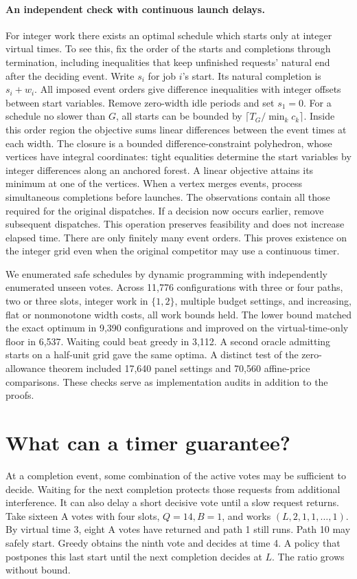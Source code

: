 \paragraph{An independent check with continuous launch delays.}
For integer work there exists an optimal schedule which starts only at integer virtual times. To see this, fix the order of the starts and completions through termination, including inequalities that keep unfinished requests' natural end after the deciding event. Write \(s_i\) for job \(i\)'s start. Its natural completion is \(s_i+w_i\). All imposed event orders give difference inequalities with integer offsets between start variables. Remove zero-width idle periods and set \(s_1=0\). For a schedule no slower than \(G\), all starts can be bounded by \(\lceil T_G/\min_k c_k\rceil\). Inside this order region the objective sums linear differences between the event times at each width. The closure is a bounded difference-constraint polyhedron, whose vertices have integral coordinates: tight equalities determine the start variables by integer differences along an anchored forest. A linear objective attains its minimum at one of the vertices. When a vertex merges events, process simultaneous completions before launches. The observations contain all those required for the original dispatches. If a decision now occurs earlier, remove subsequent dispatches. This operation preserves feasibility and does not increase elapsed time. There are only finitely many event orders. This proves existence on the integer grid even when the original competitor may use a continuous timer.

We enumerated safe schedules by dynamic programming with independently enumerated unseen votes. Across 11,776 configurations with three or four paths, two or three slots, integer work in \(\{1,2\}\), multiple budget settings, and increasing, flat or nonmonotone width costs, all work bounds held. The lower bound matched the exact optimum in 9,390 configurations and improved on the virtual-time-only floor in 6,537. Waiting could beat greedy in 3,112. A second oracle admitting starts on a half-unit grid gave the same optima. A distinct test of the zero-allowance theorem included 17,640 panel settings and 70,560 affine-price comparisons. These checks serve as implementation audits in addition to the proofs.

\section{What can a timer guarantee?}\label{app:timer}
At a completion event, some combination of the active votes may be sufficient to decide. Waiting for the next completion protects those requests from additional interference. It can also delay a short decisive vote until a slow request returns. Take sixteen A votes with four slots, \(Q=14,B=1\), and works \((L,2,1,1,\ldots,1)\). By virtual time 3, eight A votes have returned and path 1 still runs. Path 10 may safely start. Greedy obtains the ninth vote and decides at time 4. A policy that postpones this last start until the next completion decides at \(L\). The ratio grows without bound.

